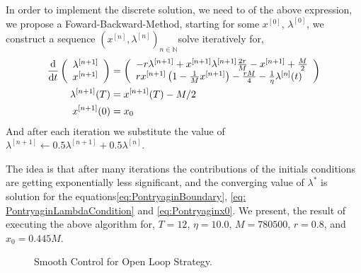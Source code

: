 In order to implement the discrete solution, we need to  of the above expression, we propose a Foward-Backward-Method, starting for some $x^{[0]}$, $\lambda^{[0]}$, we construct a sequence $\left(x^{[n]}, \lambda^{[n]}\right)_{n\in \mathbb{N}}$solve iteratively for,
\begin{align}
	\frac{\mathrm{d} }{{\mathrm{d} t}}\left(\begin{array}{l}
	\lambda^{[n+1]}\\x^{[n+1]}
	\end{array}\right)&= \left(\begin{array}{l}
	-r\lambda^{[n+1]}+x^{[n+1]}\lambda^{[n+1]} \frac{2r}{M}-x^{[n+1]}+\frac{M}{2}\\rx^{[n+1]}\left(1-\frac{1}{M}x^{[n+1]}\right)-\frac{rM}{4}-\frac{1}{\eta} \lambda^{[n]}(t)
	\end{array}\right)\label{eq: FBS}\\
	\lambda^{[n+1]}(T)&=x^{[n+1]}(T)-M/2\label{eq: FBSBoundary}\\
	x^{[n+1]}(0)&=x_0 
\end{align}
And after each iteration we substitute the value of 
$\lambda^{[n+1]}\leftarrow0.5\lambda^{[n+1]}+0.5 \lambda^{[n]}$. 

The idea is that after many iterations the contributions of the initials conditions are getting exponentially less significant, and the converging value of $\lambda^*$ is solution for the equations\ref{eq:PontryaginBoundary}, \ref{eq: PontryaginLambdaCondition} and \ref{eq:Pontryaginx0}.
We present, the result of executing the above algorithm for,
$T=12$, $\eta=10.0$, $M=780500$, $r=0.8$, and $x_0=0.445M$.
\begin{figure}[H]
	\caption{Smooth Control for Open Loop Strategy.}
\end{figure}

